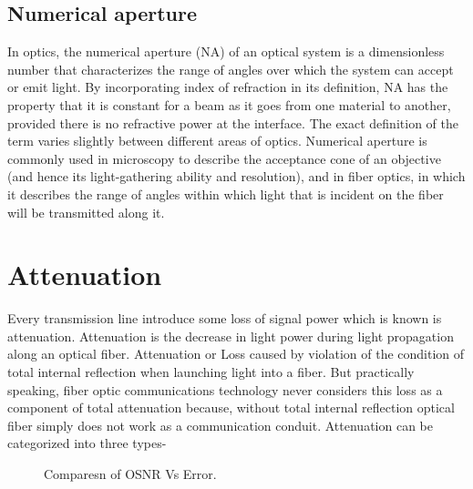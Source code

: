 \documentclass[12pt]{report}
\begin{document}
	\subsection{Numerical aperture }
	In optics, the numerical aperture (NA) of an optical system is a dimensionless number that characterizes the range of angles over which the system can accept or emit light. By incorporating index of refraction in its definition, NA has the property that it is constant for a beam as it goes from one material to another, provided there is no refractive power at the interface. The exact definition of the term varies slightly between different areas of optics. Numerical aperture is commonly used in microscopy to describe the acceptance cone of an objective (and hence its light-gathering ability and resolution), and in fiber optics, in which it describes the range of angles within which light that is incident on the fiber will be transmitted along it. 
	
	
	\section{Attenuation}
	Every transmission line introduce some loss of signal power which is known is attenuation. Attenuation is the decrease in light power during light propagation along an optical fiber. Attenuation or Loss caused by violation of the condition of total internal reflection when launching light into a fiber. But practically speaking, fiber optic communications technology never considers this loss as a component of total attenuation because, without total internal reflection optical fiber simply does not work as a communication conduit. Attenuation can be categorized into three types- 
	\begin{figure}[htbp]
		\caption{Comparesn of OSNR Vs Error.}
		\label{fig1}
	\end{figure}
\end{document}
